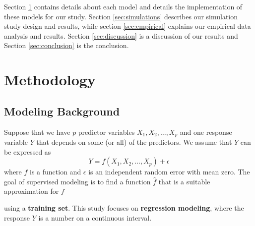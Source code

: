 \documentclass{article}
\begin{document}
	Section \ref{sec:methodology} contains details about each model and details the implementation of these models for our study. Section \ref{sec:simulations} describes our simulation study design and results, while section \ref{sec:empirical} explains our empirical data analysis and results. Section \ref{sec:discussion} is a discussion of our results and Section \ref{sec:conclusion} is the conclusion.
	
	\newpage
	\section{Methodology}\label{sec:methodology}
	\subsection{Modeling Background}
	
	Suppose that we have $p$ predictor variables $X_1, X_2, \dotsc, X_p$ and one response variable $Y$ that depends on some (or all) of the predictors. We assume that $Y$ can be expressed as
	\begin{equation}\label{eqn:relationship}
		Y = f(X_1, X_2, \dotsc, X_p) + \epsilon
	\end{equation}
	where $f$ is a function and $\epsilon$ is an independent random error with mean zero. The goal of supervised modeling is to find a function $\hat{f}$ that is a suitable approximation for $f$ 

	using a \textbf{training set}. This study focuses on \textbf{regression modeling}, where the response $Y$ is a number on a continuous interval.
	

	
\end{document}

